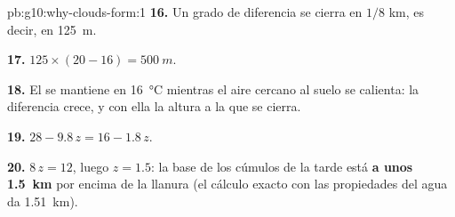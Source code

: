 \begin{solution}{pb:g10:why-clouds-form:1}
\textbf{16.} Un grado de diferencia se cierra en $1/8$ km, es decir, en
\qty{125}{m}.

\textbf{17.} $125 \times (20 - 16) = \qty{500}{m}$.

\textbf{18.} El  se mantiene en \qty{16}{\degreeCelsius}
mientras el aire cercano al suelo se calienta: la diferencia crece, y con
ella la altura a la que se cierra.

\textbf{19.} $28 - 9.8\,z = 16 - 1.8\,z$.

\textbf{20.} $8\,z = 12$, luego $z = 1.5$: la base de los cúmulos de la
tarde está \textbf{a unos \qty{1.5}{km}} por encima de la llanura (el cálculo
exacto con las propiedades del agua da \qty{1.51}{km}).
\end{solution}
